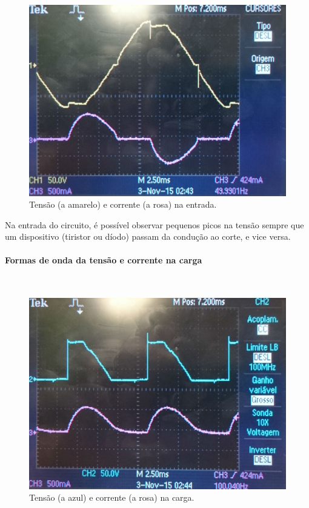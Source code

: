 \documentclass[a4paper,11pt]{article}
\numberwithin{equation}{section}
\begin{document}
\begin{figure}[H]
	\centering
	\includegraphics[keepaspectratio=true, scale=0.12]{img/DSC_0190}
	\caption{Tensão (a amarelo) e corrente (a rosa) na entrada.}
	\label{fig:tcentradasemi}
	\vspace{-0.8em}
\end{figure}

Na entrada do circuito, é possível observar pequenos picos na tensão sempre que um dispositivo (tiristor ou díodo) passam da condução ao corte, e vice versa.

\pagebreak

\paragraph{Formas de onda da tensão e corrente na carga} \mbox{}\

\begin{figure}[H]
	\centering
	\includegraphics[keepaspectratio=true, scale=0.13]{img/DSC_0191}
	\caption{Tensão (a azul) e corrente (a rosa) na carga.}
	\label{fig:tccargasemi}
	\vspace{-0.8em}
\end{figure}
\end{document}
